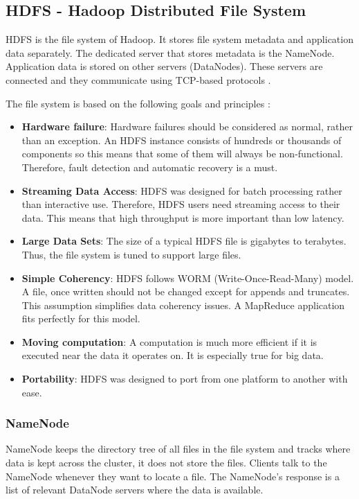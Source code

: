 \subsection{HDFS - Hadoop Distributed File System}
HDFS is the file system of Hadoop. It stores file system metadata and application data separately. The dedicated server that stores metadata is the NameNode. Application data is stored on other servers (DataNodes). These servers are connected and they communicate using TCP-based protocols \cite{Shvachko:2010:HDF:1913798.1914427}. 

\noindent The file system is based on the following goals and principles \cite{HDFS-docs}:
\begin{itemize}
	\item \textbf{Hardware failure}: Hardware failures should be considered as normal, rather than an exception. An HDFS instance consists of hundreds or thousands of components so this means that some of them will always be non-functional. Therefore, fault detection and automatic recovery is a must.
	\item \textbf{Streaming Data Access}: HDFS was designed for batch processing rather than interactive use. Therefore, HDFS users need streaming access to their data. This means that high throughput is more important than low latency.
	\item \textbf{Large Data Sets}: The size of a typical HDFS file is gigabytes to terabytes. Thus, the file system is tuned to support large files. 
	\item \textbf{Simple Coherency}: HDFS follows WORM (Write-Once-Read-Many) model. A file, once written should not be changed except for appends and truncates.  This assumption simplifies data coherency issues. A MapReduce application fits perfectly for this model.
	\item \textbf{Moving computation}: A computation is much more efficient if it is executed near the data it operates on. It is especially true for big data. 
	\item \textbf{Portability}: HDFS was designed to port from one platform to another with ease. 
\end{itemize}
\subsubsection*{NameNode}
NameNode keeps the directory tree of all files in the file system and tracks where data is kept across the cluster, it does not store the files. Clients talk to the NameNode whenever they want to locate a file. The NameNode's response is a list of relevant DataNode servers where the data is available. 

